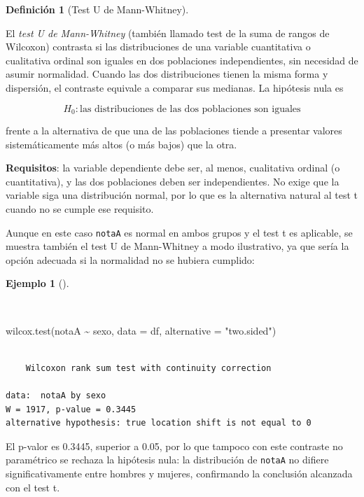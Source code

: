 \documentclass[
  spanish,
  a4paper,
]{scrreport}
\newenvironment{Shaded}{\begin{snugshade}}{\end{snugshade}}
\newcommand{\AttributeTok}[1]{\textcolor[rgb]{0.40,0.45,0.13}{#1}}
\newcommand{\FunctionTok}[1]{\textcolor[rgb]{0.28,0.35,0.67}{#1}}
\newcommand{\NormalTok}[1]{\textcolor[rgb]{0.00,0.23,0.31}{#1}}
\newcommand{\SpecialCharTok}[1]{\textcolor[rgb]{0.37,0.37,0.37}{#1}}
\newcommand{\StringTok}[1]{\textcolor[rgb]{0.13,0.47,0.30}{#1}}
\theoremstyle{definition}
\newtheorem{example}{Ejemplo}[chapter]
\theoremstyle{definition}
\newtheorem{definition}{Definición}[chapter]
\theoremstyle{remark}
\begin{document}
\begin{definition}[Test U de
Mann-Whitney]\protect\hypertarget{def-dosindep-test-u-mann-whitney}{}\label{def-dosindep-test-u-mann-whitney}

El \emph{test U de Mann-Whitney} (también llamado test de la suma de
rangos de Wilcoxon) contrasta si las distribuciones de una variable
cuantitativa o cualitativa ordinal son iguales en dos poblaciones
independientes, sin necesidad de asumir normalidad. Cuando las dos
distribuciones tienen la misma forma y dispersión, el contraste equivale
a comparar sus medianas. La hipótesis nula es

\[H_0: \mbox{las distribuciones de las dos poblaciones son iguales}\]

frente a la alternativa de que una de las poblaciones tiende a presentar
valores sistemáticamente más altos (o más bajos) que la otra.

\end{definition}

\textbf{Requisitos}: la variable dependiente debe ser, al menos,
cualitativa ordinal (o cuantitativa), y las dos poblaciones deben ser
independientes. No exige que la variable siga una distribución normal,
por lo que es la alternativa natural al test t cuando no se cumple ese
requisito.

Aunque en este caso \texttt{notaA} es normal en ambos grupos y el test t
es aplicable, se muestra también el test U de Mann-Whitney a modo
ilustrativo, ya que sería la opción adecuada si la normalidad no se
hubiera cumplido:

\begin{example}[]\protect\hypertarget{exm-dosindep-test-u-mann-whitney}{}\label{exm-dosindep-test-u-mann-whitney}

~

\begin{Shaded}
\begin{Highlighting}[]
\FunctionTok{wilcox.test}\NormalTok{(notaA }\SpecialCharTok{\textasciitilde{}}\NormalTok{ sexo, }\AttributeTok{data =}\NormalTok{ df, }\AttributeTok{alternative =} \StringTok{"two.sided"}\NormalTok{)}
\end{Highlighting}
\end{Shaded}

\begin{verbatim}

    Wilcoxon rank sum test with continuity correction

data:  notaA by sexo
W = 1917, p-value = 0.3445
alternative hypothesis: true location shift is not equal to 0
\end{verbatim}

El p-valor es 0.3445, superior a 0.05, por lo que tampoco con este
contraste no paramétrico se rechaza la hipótesis nula: la distribución
de \texttt{notaA} no difiere significativamente entre hombres y mujeres,
confirmando la conclusión alcanzada con el test t.

\end{example}
\end{document}
